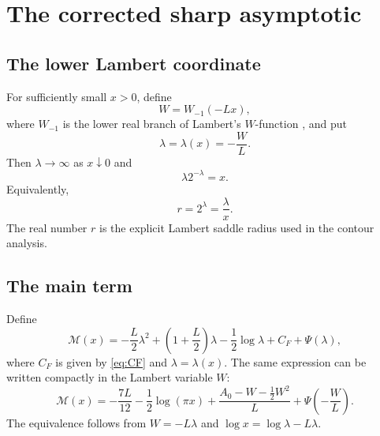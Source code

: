 \documentclass[11pt,oneside]{article}
\theoremstyle{definition}
\theoremstyle{remark}
\begin{document}
\section{The corrected sharp asymptotic}
\label{sec:sharp-asymptotic}

\subsection{The lower Lambert coordinate}

For sufficiently small $x>0$, define
\begin{equation}
 W=W_{-1}(-Lx),                                             \label{eq:W-def}
\end{equation}
where $W_{-1}$ is the lower real branch of Lambert's $W$-function \cite{corless1996},
and put
\begin{equation}
 \lambda=\lambda(x)=-\frac{W}{L}.                          \label{eq:lambda-def}
\end{equation}
Then $\lambda\to\infty$ as $x\downarrow0$ and
\begin{equation}
 \lambda2^{-\lambda}=x.                                   \label{eq:lambda-equation}
\end{equation}
Equivalently,
\begin{equation}
 r=2^\lambda=\frac\lambda x.                              \label{eq:saddle-radius}
\end{equation}
The real number $r$ is the explicit Lambert saddle radius used in the contour analysis.

\subsection{The main term}

Define
\begin{equation}
 \mathcal M(x)=
 -\frac L2\lambda^2+
 \left(1+\frac L2\right)\lambda-\frac12\log\lambda
 +C_F+\Psi(\lambda),                                      \label{eq:sharp-main-lambda}
\end{equation}
where $C_F$ is given by \eqref{eq:CF} and $\lambda=\lambda(x)$.  The same expression can be
written compactly in the Lambert variable $W$:
\begin{equation}
 \mathcal M(x)=
 -\frac{7L}{12}-\frac12\log(\pi x)
 +\frac{A_0-W-\tfrac12W^2}{L}
 +\Psi\!\left(-\frac WL\right).                           \label{eq:sharp-main-W}
\end{equation}
The equivalence follows from $W=-L\lambda$ and
$\log x=\log\lambda-L\lambda$.
\end{document}
